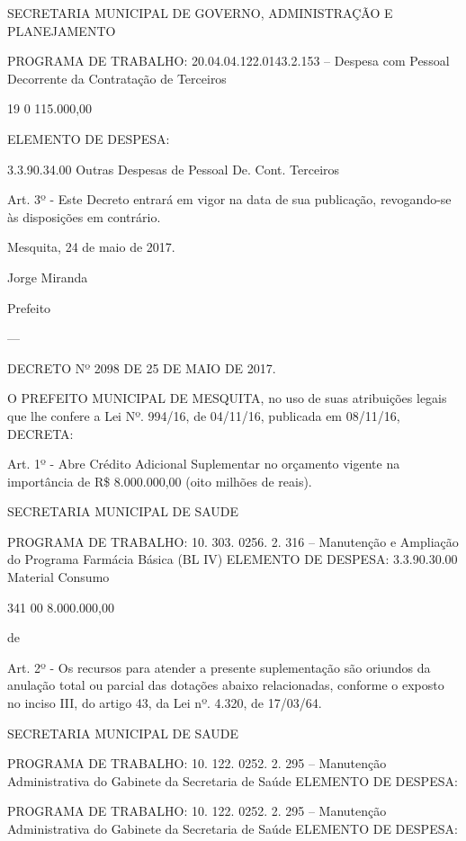 \documentclass{doliberto}
\begin{document}
 
SECRETARIA  MUNICIPAL  DE  GOVERNO,  ADMINISTRAÇÃO 
E PLANEJAMENTO 
 
 
PROGRAMA DE TRABALHO: 
20.04.04.122.0143.2.153 – Despesa com Pessoal Decorrente 
da Contratação de Terceiros  

19  0  115.000,00 

ELEMENTO DE DESPESA: 

3.3.90.34.00  Outras Despesas de 
Pessoal  De.  Cont. 
Terceiros 

 
 
Art.  3º  -  Este  Decreto  entrará  em  vigor  na  data  de  sua 
publicação, revogando-se às disposições em contrário. 
 
 

Mesquita, 24 de maio de 2017.  

Jorge Miranda 

Prefeito 

---

DECRETO Nº 2098 DE 25 DE MAIO DE 2017. 
 
 
O  PREFEITO  MUNICIPAL  DE  MESQUITA,  no  uso  de  suas 
atribuições  legais  que  lhe  confere  a  Lei  Nº.  994/16,  de 
04/11/16, publicada em 08/11/16, DECRETA: 
 
 
Art. 1º - Abre Crédito Adicional Suplementar no orçamento 
vigente na importância de R\$ 8.000.000,00 (oito milhões de 
reais). 
 
 
SECRETARIA MUNICIPAL DE SAUDE 
 
 
PROGRAMA DE TRABALHO: 
10.  303.  0256.  2.  316  –  Manutenção  e  Ampliação  do 
Programa Farmácia Básica (BL IV) 
ELEMENTO DE DESPESA: 
3.3.90.30.00  Material 
Consumo 

341  00  8.000.000,00 

de 
 
Art. 2º - Os recursos para atender a presente suplementação 
são  oriundos  da  anulação  total  ou  parcial  das  dotações 
abaixo  relacionadas,  conforme  o  exposto  no  inciso  III,  do 
artigo 43, da Lei nº. 4.320, de 17/03/64. 
 
 
SECRETARIA MUNICIPAL DE SAUDE 
 
 
PROGRAMA DE TRABALHO: 
10.  122.  0252.  2.  295  –  Manutenção  Administrativa  do 
Gabinete da Secretaria de Saúde 
ELEMENTO DE DESPESA: 

 

 
 
PROGRAMA DE TRABALHO: 
10.  122.  0252.  2.  295  –  Manutenção  Administrativa  do 
Gabinete da Secretaria de Saúde 
ELEMENTO DE DESPESA: 
\end{document}
